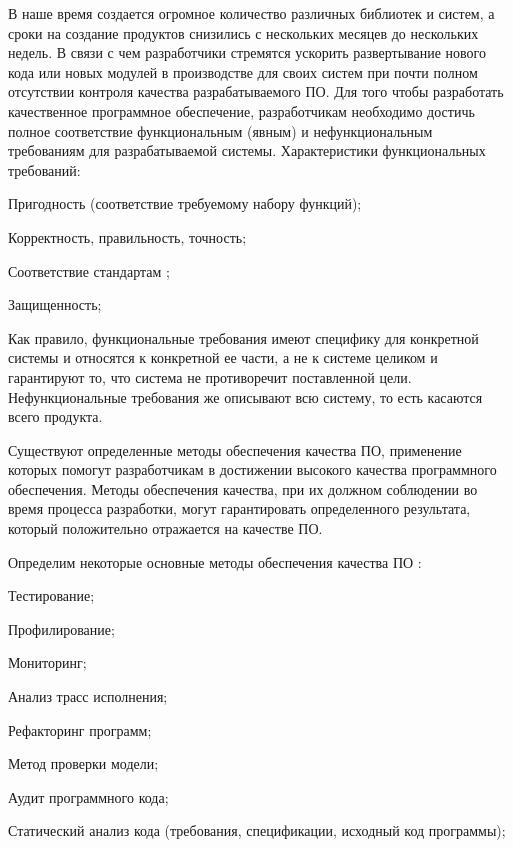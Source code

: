 \intro

В наше время создается огромное количество различных библиотек и систем, а сроки на создание продуктов снизились с нескольких месяцев до нескольких недель.
В связи с чем разработчики стремятся ускорить развертывание нового кода или новых модулей в производстве для своих систем при почти полном отсутствии контроля качества разрабатываемого ПО.
Для того чтобы разработать качественное программное обеспечение, разработчикам необходимо достичь полное соответствие функциональным (явным) и нефункциональным требованиям для разрабатываемой системы.
Характеристики функциональных требований:
%
\begin{itemize*}
\item Пригодность (соответствие требуемому набору функций);
\item Корректность, правильность, точность;
\item Соответствие стандартам ;
\item Защищенность;
\end{itemize*}
%

Как правило, функциональные требования имеют специфику для конкретной системы и относятся к конкретной ее части, а не к системе целиком и гарантируют то, что система не противоречит поставленной цели.
Нефункциональные требования же описывают всю систему, то есть касаются всего продукта.

Существуют определенные методы обеспечения качества ПО, применение которых помогут разработчикам в достижении высокого качества программного обеспечения.
Методы обеспечения качества, при их должном соблюдении во время процесса разработки, могут гарантировать определенного результата, который положительно отражается на качестве ПО.

Определим некоторые основные методы обеспечения качества ПО \cite{PI_book}:
%
\begin{itemize*}
\item Тестирование;
\item Профилирование;
\item Мониторинг;
\item Анализ трасс исполнения;
\item Рефакторинг программ;
\item Метод проверки модели;
\item Аудит программного кода;
\item Статический анализ кода (требования, спецификации, исходный код программы);
\end{itemize*}


